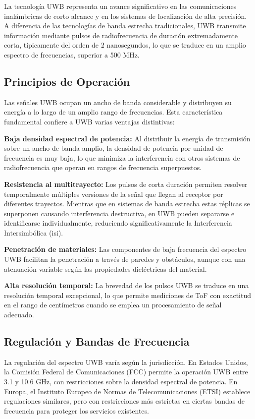 La tecnología UWB representa un avance significativo en las comunicaciones inalámbricas de corto alcance y en los sistemas de localización de alta precisión. A diferencia de las tecnologías de banda estrecha tradicionales, UWB transmite información mediante pulsos de radiofrecuencia de duración extremadamente corta, típicamente del orden de 2 nanosegundos, lo que se traduce en un amplio espectro de frecuencias, superior a 500 MHz.

\subsection{Principios de Operación}

Las señales UWB ocupan un ancho de banda considerable y distribuyen su energía a lo largo de un amplio rango de frecuencias. Esta característica fundamental confiere a UWB varias ventajas distintivas:

\textbf{Baja densidad espectral de potencia:} Al distribuir la energía de transmisión sobre un ancho de banda amplio, la densidad de potencia por unidad de frecuencia es muy baja, lo que minimiza la interferencia con otros sistemas de radiofrecuencia que operan en rangos de frecuencia superpuestos.

\textbf{Resistencia al multitrayecto:} Los pulsos de corta duración permiten resolver temporalmente múltiples versiones de la señal que llegan al receptor por diferentes trayectos. Mientras que en sistemas de banda estrecha estas réplicas se superponen causando interferencia destructiva, en UWB pueden separarse e identificarse individualmente, reduciendo significativamente la Interferencia Intersimbólica (\gls{isi}).

\textbf{Penetración de materiales:} Las componentes de baja frecuencia del espectro UWB facilitan la penetración a través de paredes y obstáculos, aunque con una atenuación variable según las propiedades dieléctricas del material.

\textbf{Alta resolución temporal:} La brevedad de los pulsos UWB se traduce en una resolución temporal excepcional, lo que permite mediciones de ToF con exactitud en el rango de centímetros cuando se emplea un procesamiento de señal adecuado.

\subsection{Regulación y Bandas de Frecuencia}

La regulación del espectro UWB varía según la jurisdicción. En Estados Unidos, la Comisión Federal de Comunicaciones (FCC) permite la operación UWB entre 3.1 y 10.6 GHz, con restricciones sobre la densidad espectral de potencia. En Europa, el Instituto Europeo de Normas de Telecomunicaciones (ETSI) establece regulaciones similares, pero con restricciones más estrictas en ciertas bandas de frecuencia para proteger los servicios existentes.

